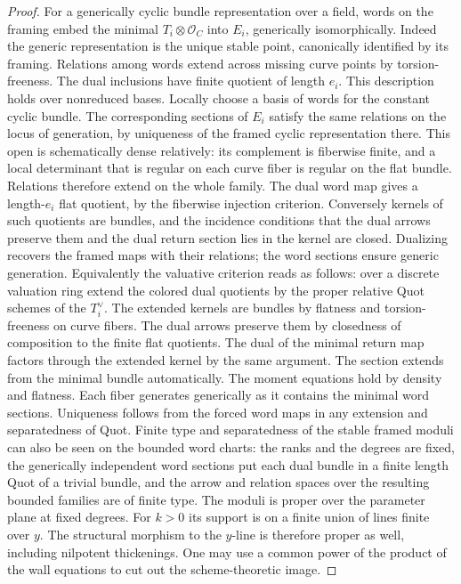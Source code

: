 \begin{proof}
For a generically cyclic bundle representation over a field, words on the framing embed the minimal $T_i\otimes\mathcal O_C$ into $E_i$, generically isomorphically. Indeed the generic representation is the unique stable point, canonically identified by its framing. Relations among words extend across missing curve points by torsion-freeness. The dual inclusions have finite quotient of length $e_i$. This description holds over nonreduced bases. Locally choose a basis of words for the constant cyclic bundle. The corresponding sections of $E_i$ satisfy the same relations on the locus of generation, by uniqueness of the framed cyclic representation there. This open is schematically dense relatively: its complement is fiberwise finite, and a local determinant that is regular on each curve fiber is regular on the flat bundle. Relations therefore extend on the whole family. The dual word map gives a length-$e_i$ flat quotient, by the fiberwise injection criterion. Conversely kernels of such quotients are bundles, and the incidence conditions that the dual arrows preserve them and the dual return section lies in the kernel are closed. Dualizing recovers the framed maps with their relations; the word sections ensure generic generation. Equivalently the valuative criterion reads as follows: over a discrete valuation ring extend the colored dual quotients by the proper relative Quot schemes of the $T_i^\vee$. The extended kernels are bundles by flatness and torsion-freeness on curve fibers. The dual arrows preserve them by closedness of composition to the finite flat quotients. The dual of the minimal return map factors through the extended kernel by the same argument. The section extends from the minimal bundle automatically. The moment equations hold by density and flatness. Each fiber generates generically as it contains the minimal word sections. Uniqueness follows from the forced word maps in any extension and separatedness of Quot. Finite type and separatedness of the stable framed moduli can also be seen on the bounded word charts: the ranks and the degrees are fixed, the generically independent word sections put each dual bundle in a finite length Quot of a trivial bundle, and the arrow and relation spaces over the resulting bounded families are of finite type. The moduli is proper over the parameter plane at fixed degrees. For $k>0$ its support is on a finite union of lines finite over $y$. The structural morphism to the $y$-line is therefore proper as well, including nilpotent thickenings. One may use a common power of the product of the wall equations to cut out the scheme-theoretic image.

\end{proof}

